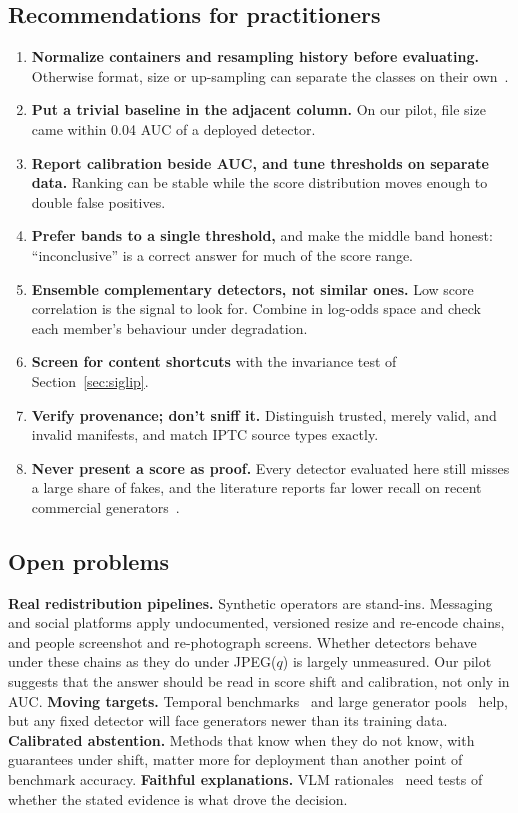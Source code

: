 \documentclass[conference]{IEEEtran}
\begin{document}
\subsection{Recommendations for practitioners}
\begin{enumerate}
\item \textbf{Normalize containers and resampling history before evaluating.}
  Otherwise format, size or up-sampling can separate the classes on their
  own~\cite{grommelt2024fakeorjpeg,kumar2026aigcdetect}.
\item \textbf{Put a trivial baseline in the adjacent column.} On our pilot,
  file size came within 0.04 AUC of a deployed detector.
\item \textbf{Report calibration beside AUC, and tune thresholds on separate
  data.} Ranking can be stable while the score distribution moves enough to
  double false positives.
\item \textbf{Prefer bands to a single threshold,} and make the middle band
  honest: ``inconclusive'' is a correct answer for much of the score range.
\item \textbf{Ensemble complementary detectors, not similar ones.} Low score
  correlation is the signal to look for. Combine in log-odds space and check
  each member's behaviour under degradation.
\item \textbf{Screen for content shortcuts} with the invariance test of
  Section~\ref{sec:siglip}.
\item \textbf{Verify provenance; don't sniff it.} Distinguish trusted, merely
  valid, and invalid manifests, and match IPTC source types exactly.
\item \textbf{Never present a score as proof.} Every detector evaluated here
  still misses a large share of fakes, and the literature reports far lower
  recall on recent commercial generators~\cite{ren2026outofbox}.
\end{enumerate}

\subsection{Open problems}
\textbf{Real redistribution pipelines.} Synthetic operators are stand-ins.
Messaging and social platforms apply undocumented, versioned resize and
re-encode chains, and people screenshot and re-photograph screens. Whether
detectors behave under these chains as they do under JPEG($q$) is largely
unmeasured. Our pilot suggests that the answer should be read in score
shift and calibration, not only in AUC.
\textbf{Moving targets.} Temporal benchmarks~\cite{pellegrini2025aigenbench}
and large generator pools~\cite{park2025commfor} help, but any fixed
detector will face generators newer than its training data.
\textbf{Calibrated abstention.} Methods that know when they do not know,
with guarantees under shift, matter more for deployment than another point
of benchmark accuracy.
\textbf{Faithful explanations.} VLM rationales~\cite{sharma2025mirage,yu2026agentfox}
need tests of whether the stated evidence is what drove the decision.
\end{document}
